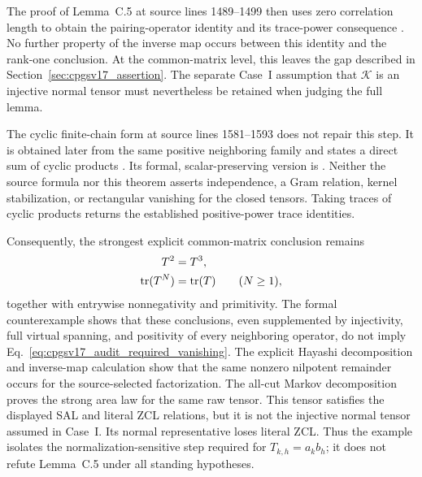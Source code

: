 \documentclass{article}
\begin{document}
The proof of Lemma~C.5 at source lines 1489--1499 then uses zero correlation
length to obtain the pairing-operator identity and its trace-power consequence
\cite[Appendix~C.2]{Cirac2016MPDO_arXiv}. No further property of the inverse
map occurs between this identity and the rank-one conclusion. At the
common-matrix level, this leaves the gap described in
Section~\ref{sec:cpgsv17_assertion}. The separate Case~I assumption that
$\mathcal K$ is an injective normal tensor must nevertheless be retained when
judging the full lemma.

The cyclic finite-chain form at source lines 1581--1593 does not repair this
step. It is obtained later from the same positive neighboring family and
states a direct sum of cyclic products
\cite[Appendix~C.2]{Cirac2016MPDO_arXiv}. Its formal, scalar-preserving version
is
. Neither the source formula
nor this theorem asserts independence, a Gram relation, kernel stabilization,
or rectangular vanishing for the closed tensors. Taking traces of cyclic
products returns the established positive-power trace identities.

Consequently, the strongest explicit common-matrix conclusion remains
\begin{align}
    T^2
        &= T^3,
    \label{eq:cpgsv17_audit_square_cube}\\
    \operatorname{tr}(T^N)
        &= \operatorname{tr}(T)
        \qquad (N\geq 1),
    \label{eq:cpgsv17_audit_constant_traces}
\end{align}
together with entrywise nonnegativity and primitivity. The formal
counterexample shows that these conclusions, even supplemented by injectivity,
full virtual spanning, and positivity of every neighboring operator, do not
imply Eq.~\ref{eq:cpgsv17_audit_required_vanishing}. The explicit Hayashi
decomposition and inverse-map calculation show that the same nonzero nilpotent
remainder occurs for the source-selected factorization. The all-cut Markov
decomposition proves the strong area law for the same raw tensor. This tensor
satisfies the displayed SAL and literal ZCL relations, but it is not the
injective normal tensor assumed in Case~I. Its normal representative loses
literal ZCL. Thus the example isolates the normalization-sensitive step
required for $T_{k,h}=a_kb_h$; it does not refute Lemma~C.5 under all standing
hypotheses.
\end{document}
